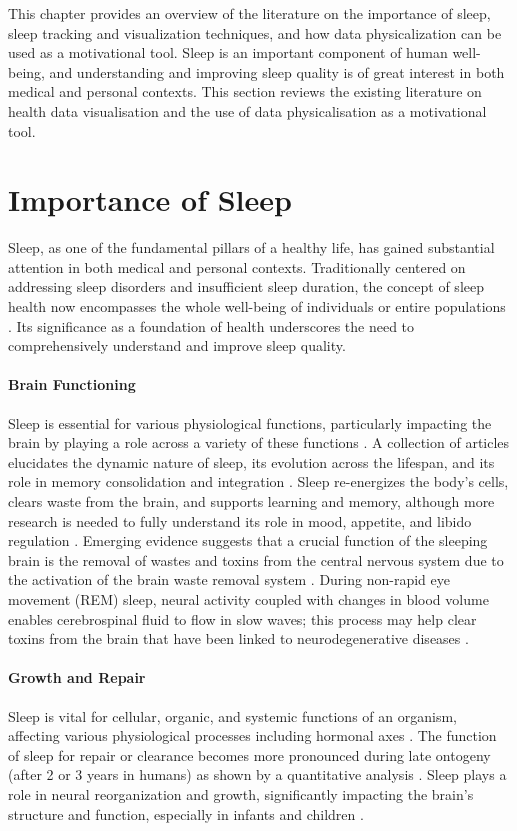 \documentclass[
  a4paper,  %
  twoside,  %
  bibliography=totoc,
  headsepline,
  cleardoublepage=empty,
  parskip=half,
  draft=false
]{scrbook}
\begin{document}
This chapter provides an overview of the literature on the importance of sleep, sleep tracking and visualization techniques, and how data physicalization can be used as a motivational tool.
Sleep is an important component of human well-being, and understanding and improving sleep quality is of great interest in both medical and personal contexts. This section reviews the existing literature on health data visualisation and the use of data physicalisation as a motivational tool.

\section{Importance of Sleep}

Sleep, as one of the fundamental pillars of a healthy life, has gained substantial attention in both medical and personal contexts. Traditionally centered on addressing sleep disorders and insufficient sleep duration, the concept of sleep health now encompasses the whole well-being of individuals or entire populations \cite{Define_Sleep_Health}. Its significance as a foundation of health underscores the need to comprehensively understand and improve sleep quality.

\paragraph{Brain Functioning}
Sleep is essential for various physiological functions, particularly impacting the brain by playing a role across a variety of these functions \cite{tai_impact_2022}. A collection of articles elucidates the dynamic nature of sleep, its evolution across the lifespan, and its role in memory consolidation and integration \cite{simon_functions_2022}. Sleep re-energizes the body’s cells, clears waste from the brain, and supports learning and memory, although more research is needed to fully understand its role in mood, appetite, and libido regulation \cite{cirelli_sleeping_2017}. Emerging evidence suggests that a crucial function of the sleeping brain is the removal of wastes and toxins from the central nervous system due to the activation of the brain waste removal system \cite{semyachkina-glushkovskaya_brain_2023}. During non-rapid eye movement (REM) sleep, neural activity coupled with changes in blood volume enables cerebrospinal fluid to flow in slow waves; this process may help clear toxins from the brain that have been linked to neurodegenerative diseases \cite{lehmann_slow_2019}.

\paragraph{Growth and Repair}
Sleep is vital for cellular, organic, and systemic functions of an organism, affecting various physiological processes including hormonal axes \cite{dattilo_sleep_2011}. The function of sleep for repair or clearance becomes more pronounced during late ontogeny (after 2 or 3 years in humans) as shown by a quantitative analysis \cite{cao_unraveling_2020}. Sleep plays a role in neural reorganization and growth, significantly impacting the brain's structure and function, especially in infants and children \cite{brinkman_physiology_2023}.
\end{document}
